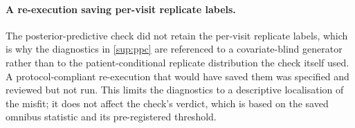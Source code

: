 \paragraph{A re-execution saving per-visit replicate labels.} The
posterior-predictive check did not retain the per-visit replicate labels, which is
why the diagnostics in \ref{sup:ppc} are referenced to a covariate-blind
generator rather than to the patient-conditional replicate distribution the check
itself used. A protocol-compliant re-execution that would have saved them was
specified and reviewed but not run. This limits the diagnostics to a descriptive
localisation of the misfit; it does not affect the check's verdict, which is based
on the saved omnibus statistic and its pre-registered threshold.
